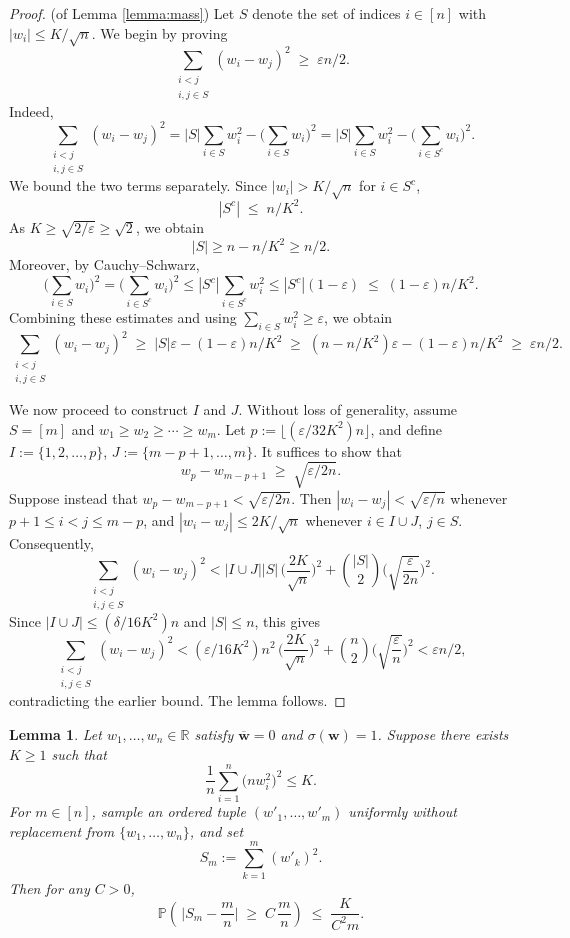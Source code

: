 \documentclass[reqno]{amsart}
\newcommand\R{{\mathbb{R}}}
\renewcommand\P{{\mathbb{P}}}
\newcommand\eps{{\varepsilon}}
\newcommand\BMw{{\bm w}}
\theoremstyle{plain}
\newtheorem{lemma}[theorem]{Lemma}
\theoremstyle{definition}
\begin{document}
\begin{proof}(of Lemma \ref{lemma:mass})
Let $S$ denote the set of indices $i\in [n]$ with $|w_i|\le K/\sqrt{n}$. We begin by proving 
\[
\sum_{\substack{i<j \\ i,j\in S}} (w_i-w_j)^2 \;\ge\; \eps n/2.
\]
Indeed,
\[
\sum_{\substack{i<j \\ i,j\in S}} (w_i-w_j)^2
= |S|\sum_{i\in S} w_i^2 - \Big(\sum_{i\in S} w_i\Big)^2
= |S|\sum_{i\in S} w_i^2 - \Big(\sum_{i\in S^{c}} w_i\Big)^2.
\]
We bound the two terms separately. Since $|w_i| > K/\sqrt{n}$ for $i\in S^{c}$,  
\[
|S^{c}| \;\le\; n/K^2.
\]
As $K \ge \sqrt{2/\eps} \ge \sqrt{2}$, we obtain
\[
|S| \ge n-n/K^2 \ge n/2.
\]
Moreover, by Cauchy--Schwarz,
\[
\Big(\sum_{i\in S} w_i\Big)^2
= \Big(\sum_{i\in S^{c}} w_i\Big)^2
\le |S^{c}| \sum_{i\in S^{c}} w_i^2
\le |S^{c}|(1-\eps) 
\;\le\; (1-\eps)n/K^2.
\]
Combining these estimates and using $\sum_{i\in S} w_i^2 \ge \eps$, we obtain
\[
\sum_{\substack{i<j \\ i,j\in S}} (w_i-w_j)^2
\;\ge\; |S|\eps - (1-\eps)n/K^2
\;\ge\; (n-n/K^2)\eps - (1-\eps)n/K^2
\;\ge\; \eps n/2.
\]

\smallskip
We now proceed to construct $I$ and $J$. Without loss of generality, assume $S=[m]$ and $w_1 \ge w_2 \ge \cdots \ge w_m$.  
Let $p := \lfloor (\eps/32K^2)n \rfloor$, and define $I := \{1,2,\dots,p\}$, $J := \{m-p+1,\dots,m\}$.  
It suffices to show that
\[
w_p-w_{m-p+1}\;\ge\; \sqrt{\eps/2n}.
\]
Suppose instead that $w_p - w_{m-p+1} < \sqrt{\eps/2n}$.  
Then $|w_i-w_j| < \sqrt{\eps/n}$ whenever $p+1 \le i < j \le m-p$,  
and $|w_i-w_j| \le 2K/\sqrt{n}$ whenever $i \in I \cup J$, $j \in S$.  
Consequently, 
\[
\sum_{\substack{i<j \\ i,j\in S}} (w_i-w_j)^2
< |I\cup J||S| \, \Big(\frac{2K}{\sqrt{n}}\Big)^2
  + \binom{|S|}{2} \Big(\sqrt{\frac{\eps}{2n}}\Big)^2.
\]
Since $|I\cup J| \le (\delta/16K^2)n$ and $|S|\le n$, this gives
\[
\sum_{\substack{i<j \\ i,j\in S}} (w_i-w_j)^2
< (\eps/16K^2)n^2 \, \Big(\frac{2K}{\sqrt{n}}\Big)^2
   + \binom{n}{2} \Big(\sqrt{\frac{\eps}{n}}\Big)^2
< \eps n/2,
\]
contradicting the earlier bound. The lemma follows.
\end{proof}

\begin{lemma}\label{lemma:m/n} 
Let $w_1,\dots,w_n\in\R$ satisfy $\overline{\BMw}=0$ and $\sigma(\BMw)=1$. 
Suppose there exists $K\ge 1$ such that
\[
\frac{1}{n}\sum_{i=1}^n \big(n w_{i}^{2}\big)^{2} \le K .
\]
For $m\in[n]$, sample an ordered tuple $(w'_{1},\ldots,w'_{m})$ uniformly without replacement from $\{w_{1},\ldots,w_{n}\}$, and set
\[
S_m := \sum_{k=1}^m (w'_k)^2.
\]
Then for any $C>0$,
\[
\P\!\left( \,\Big|S_m-\frac{m}{n}\Big| \;\ge\; C\,\frac{m}{n} \right) \;\le\; \frac{K}{C^{2}m}.
\]
\end{lemma}
\end{document}
